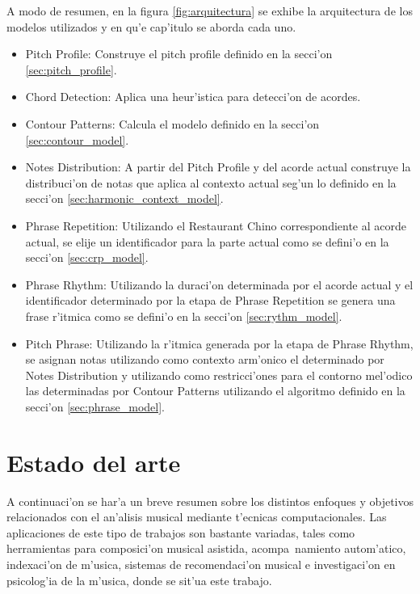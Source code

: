A modo de resumen, en la figura \ref{fig:arquitectura} se exhibe la arquitectura de los modelos utilizados y en qu'e cap'itulo se aborda cada uno.

\begin{imagen}
    \width{10.5cm}
\end{imagen}

\begin{itemize}
 \item Pitch Profile: Construye el pitch profile definido en la secci'on \ref{sec:pitch_profile}.
 \item Chord Detection: Aplica una heur'istica para detecci'on de acordes.
 \item Contour Patterns: Calcula el modelo definido en la secci'on \ref{sec:contour_model}.
 \item Notes Distribution: A partir del Pitch Profile y del acorde actual construye la distribuci'on de notas que aplica al contexto actual seg'un lo definido en la secci'on \ref{sec:harmonic_context_model}.
 \item Phrase Repetition: Utilizando el Restaurant Chino correspondiente al acorde actual, se elije un identificador para la parte actual como 
 se defini'o en la secci'on \ref{sec:crp_model}.
 \item Phrase Rhythm: Utilizando la duraci'on determinada por el acorde actual y el identificador determinado por la etapa de Phrase Repetition se 
 genera una frase r'itmica como se defini'o en la secci'on \ref{sec:rythm_model}.
 \item Pitch Phrase: Utilizando la r'itmica generada por la etapa de Phrase Rhythm, se asignan notas utilizando como contexto arm'onico el determinado 
 por Notes Distribution y utilizando como restricci'ones para el contorno mel'odico las determinadas por Contour Patterns utilizando 
 el algoritmo definido en la secci'on \ref{sec:phrase_model}.
\end{itemize}


\section{Estado del arte}
\label{sec:state_art}
A continuaci'on se har'a un breve resumen sobre los distintos enfoques y objetivos relacionados con el an'alisis musical mediante
t'ecnicas computacionales. Las aplicaciones de este tipo de trabajos son bastante variadas, tales como herramientas para 
composici'on musical asistida, acompa~namiento autom'atico, indexaci'on de m'usica, sistemas de recomendaci'on musical e 
investigaci'on en psicolog'ia de la m'usica, donde se sit'ua este trabajo.

